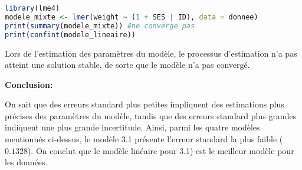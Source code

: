 \documentclass[../main.tex]{subfiles}
\begin{document}
\begin{CJK*}{UTF8}{gbsn}
\begin{lstlisting}[language=R]
library(lme4)
modele_mixte <- lmer(weight ~ (1 + SES | ID), data = donnee)
print(summary(modele_mixte)) #ne converge pas
print(confint(modele_lineaire))
\end{lstlisting}

Lors de l'estimation des paramètres du modèle, 
le processus d'estimation n'a pas atteint une solution stable, 
de sorte que le modèle n'a pas convergé.

\textbf{Conclusion:}

On sait que des erreurs standard plus petites impliquent 
des estimations plus précises des paramètres du modèle, 
tandis que des erreurs standard plus grandes indiquent une plus grande incertitude. 
Ainsi, parmi les quatre modèles mentionnés ci-dessus, 
le modèle 3.1 présente l'erreur standard la plus faible ($0.1328$).
On conclut que le modèle linéaire pour 3.1) est le meilleur modèle pour les données.

\end{CJK*}
\end{document}

